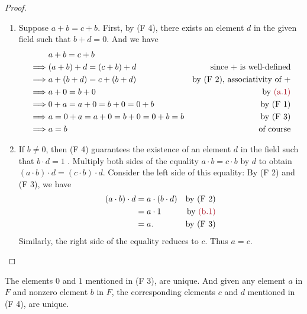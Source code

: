 \begin{proof} \ 

\begin{enumerate}
\item Suppose \(a + b = c + b\).
First, by (F 4), there exists an element \(d\) in the given field such that \(b + d = 0\). 
And we have
\begin{align*}
             & a + b = c + b \\
    \implies & (a + b) + d = (c + b) + d & \text{since \(+\) is well-defined} \\
    \implies & a + (b + d) = c + (b + d) & \text{by (F 2), associativity of \(+\)} \\
    \implies & a + 0 = b + 0 & \text{by \MAROON{(a.1)}} \\
    \implies & 0 + a = a + 0 = b + 0 = 0 + b & \text{by (F 1)} \\
    \implies & a = 0 + a = a + 0 = b + 0 = 0 + b = b & \text{by (F 3)} \\
    \implies & a = b & \text{of course}
\end{align*}

\item If \(b \ne 0\), then (F 4) guarantees the existence of an element \(d\) in the field such that \(b \cdot d = 1\) .
Multiply both sides of the equality \(a \cdot b = c \cdot b\) by \(d\) to obtain \((a \cdot b) \cdot d = (c \cdot b) \cdot d\).
Consider the left side of this equality: By (F 2) and (F 3), we have
\begin{align*}
    (a \cdot b) \cdot d & = a \cdot (b \cdot d) & \text{by (F 2)} \\
        & = a \cdot 1 & \text{by \MAROON{(b.1)}} \\
        & = a. & \text{by (F 3)}
\end{align*}
Similarly, the right side of the equality reduces to \(c\).
Thus \(a = c\).
\end{enumerate}
\end{proof}

\begin{appendix corollary} \label{corollary c.1.1}
The elements \(0\) and \(1\) mentioned in (F 3), are unique.
And given any element \(a\) in \(F\) and nonzero element \(b\) in \(F\), the corresponding elements \(c\) and \(d\) mentioned in (F 4), are unique.
\end{appendix corollary}


